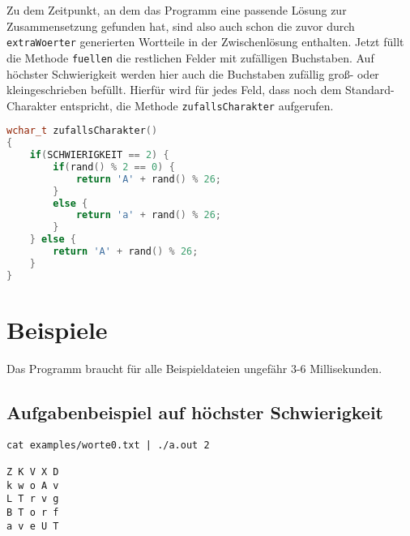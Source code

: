 \documentclass[a4paper,10pt,ngerman]{scrartcl}
\begin{document}
Zu dem Zeitpunkt, an dem das Programm eine passende Lösung zur Zusammensetzung gefunden hat, sind also auch
schon die zuvor durch \lstinline{extraWoerter} generierten Wortteile in der Zwischenlösung enthalten.
Jetzt füllt die Methode \lstinline{fuellen} die restlichen Felder mit zufälligen Buchstaben. 
Auf höchster Schwierigkeit werden hier auch die Buchstaben zufällig groß- oder kleingeschrieben befüllt.
Hierfür wird für jedes Feld, dass noch dem Standard-Charakter entspricht, die Methode \lstinline{zufallsCharakter} aufgerufen.

\begin{lstlisting}[language=C++]
wchar_t zufallsCharakter()
{
    if(SCHWIERIGKEIT == 2) {
        if(rand() % 2 == 0) {
            return 'A' + rand() % 26;
        }
        else {
            return 'a' + rand() % 26;
        }
    } else {
        return 'A' + rand() % 26;
    }
}
\end{lstlisting}

\section{Beispiele}
Das Programm braucht für alle Beispieldateien ungefähr 3-6 Millisekunden.
\subsection*{Aufgabenbeispiel auf höchster Schwierigkeit}
\begin{lstlisting}
cat examples/worte0.txt | ./a.out 2

Z K V X D
k w o A v
L T r v g
B T o r f
a v e U T
\end{lstlisting}
\end{document}

